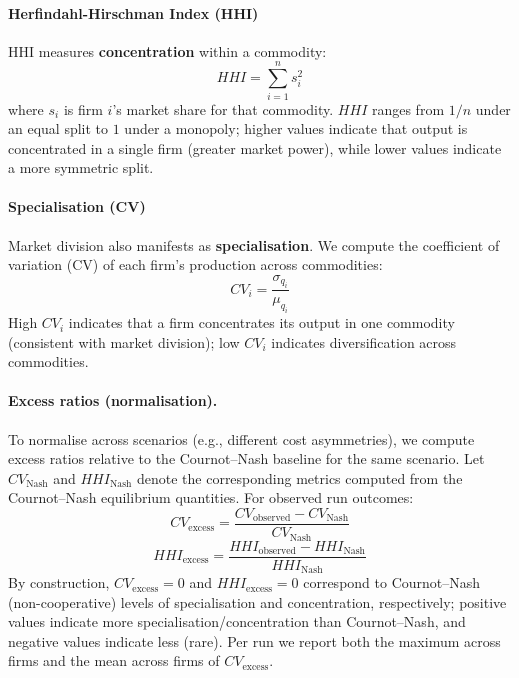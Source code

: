 \documentclass[11pt, a4paper]{article}
\begin{document}
\paragraph{\textbf{Herfindahl-Hirschman Index (HHI)}}
HHI measures \textbf{concentration} within a commodity:
\begin{equation}
    HHI = \sum_{i=1}^{n} s_i^2
\label{eq:hhi}
\end{equation}
where $s_i$ is firm $i$'s market share for that commodity. $HHI$ ranges from $1/n$ under an equal split to $1$ under a monopoly; higher values indicate that output is concentrated in a single firm (greater market power), while lower values indicate a more symmetric split.

\paragraph{\textbf{Specialisation (CV)}}
Market division also manifests as \textbf{specialisation}. We compute the coefficient of variation (CV) of each firm's production across commodities:
\begin{equation}
    CV_i = \frac{\sigma_{q_i}}{\mu_{q_i}}
\label{eq:cv}
\end{equation}
High $CV_i$ indicates that a firm concentrates its output in one commodity (consistent with market division); low $CV_i$ indicates diversification across commodities.

\paragraph{\textbf{Excess ratios (normalisation).}}
To normalise across scenarios (e.g., different cost asymmetries), we compute excess ratios relative to the Cournot--Nash baseline for the same scenario. Let $CV_{\mathrm{Nash}}$ and $HHI_{\mathrm{Nash}}$ denote the corresponding metrics computed from the Cournot--Nash equilibrium quantities. For observed run outcomes:
\begin{equation}
CV_{\mathrm{excess}} = \frac{CV_{\mathrm{observed}} - CV_{\mathrm{Nash}}}{CV_{\mathrm{Nash}}}
\label{eq:cv_excess}
\end{equation}
\begin{equation}
HHI_{\mathrm{excess}} = \frac{HHI_{\mathrm{observed}} - HHI_{\mathrm{Nash}}}{HHI_{\mathrm{Nash}}}
\label{eq:hhi_excess}
\end{equation}
By construction, $CV_{\mathrm{excess}}=0$ and $HHI_{\mathrm{excess}}=0$ correspond to Cournot--Nash (non-cooperative) levels of specialisation and concentration, respectively; positive values indicate more specialisation/concentration than Cournot--Nash, and negative values indicate less (rare). Per run we report both the maximum across firms and the mean across firms of $CV_{\mathrm{excess}}$.
\end{document}
